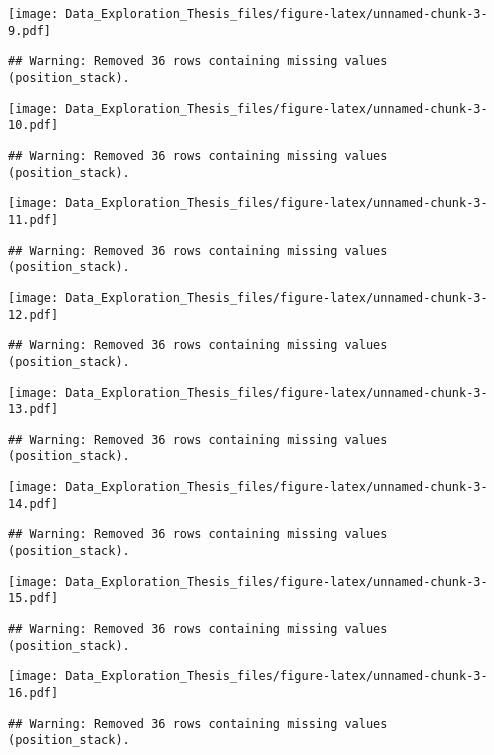 \documentclass[]{article}
\begin{document}
\texttt{[image: Data\_Exploration\_Thesis\_files/figure-latex/unnamed-chunk-3-9.pdf]}

\begin{verbatim}
## Warning: Removed 36 rows containing missing values (position_stack).
\end{verbatim}

\texttt{[image: Data\_Exploration\_Thesis\_files/figure-latex/unnamed-chunk-3-10.pdf]}

\begin{verbatim}
## Warning: Removed 36 rows containing missing values (position_stack).
\end{verbatim}

\texttt{[image: Data\_Exploration\_Thesis\_files/figure-latex/unnamed-chunk-3-11.pdf]}

\begin{verbatim}
## Warning: Removed 36 rows containing missing values (position_stack).
\end{verbatim}

\texttt{[image: Data\_Exploration\_Thesis\_files/figure-latex/unnamed-chunk-3-12.pdf]}

\begin{verbatim}
## Warning: Removed 36 rows containing missing values (position_stack).
\end{verbatim}

\texttt{[image: Data\_Exploration\_Thesis\_files/figure-latex/unnamed-chunk-3-13.pdf]}

\begin{verbatim}
## Warning: Removed 36 rows containing missing values (position_stack).
\end{verbatim}

\texttt{[image: Data\_Exploration\_Thesis\_files/figure-latex/unnamed-chunk-3-14.pdf]}

\begin{verbatim}
## Warning: Removed 36 rows containing missing values (position_stack).
\end{verbatim}

\texttt{[image: Data\_Exploration\_Thesis\_files/figure-latex/unnamed-chunk-3-15.pdf]}

\begin{verbatim}
## Warning: Removed 36 rows containing missing values (position_stack).
\end{verbatim}

\texttt{[image: Data\_Exploration\_Thesis\_files/figure-latex/unnamed-chunk-3-16.pdf]}

\begin{verbatim}
## Warning: Removed 36 rows containing missing values (position_stack).
\end{verbatim}
\end{document}
